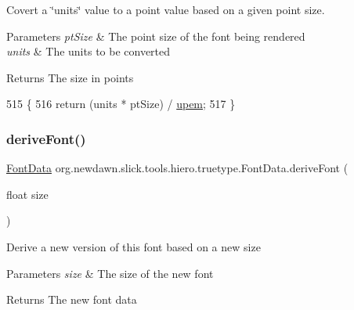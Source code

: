 Covert a \char`\"{}units\char`\"{} value to a point value based on a given point size.


\begin{DoxyParams}{Parameters}
{\em pt\+Size} & The point size of the font being rendered \\
\hline
{\em units} & The units to be converted \\
\hline
\end{DoxyParams}
\begin{DoxyReturn}{Returns}
The size in points 
\end{DoxyReturn}

\begin{DoxyCode}
515                                                           \{
516         \textcolor{keywordflow}{return} (units * ptSize) / \mbox{\hyperlink{classorg_1_1newdawn_1_1slick_1_1tools_1_1hiero_1_1truetype_1_1_font_data_ab589aa26cfcd58d7e7f8ffa3c68800a5}{upem}};
517     \}
\end{DoxyCode}
\mbox{\label{classorg_1_1newdawn_1_1slick_1_1tools_1_1hiero_1_1truetype_1_1_font_data_a15b684f10d110c105f3343f2651c7291}} 
\subsubsection{\texorpdfstring{derive\+Font()}{deriveFont()}\hspace{0.1cm}{\footnotesize\ttfamily [1/2]}}
{\footnotesize\ttfamily \mbox{\hyperlink{classorg_1_1newdawn_1_1slick_1_1tools_1_1hiero_1_1truetype_1_1_font_data}{Font\+Data}} org.\+newdawn.\+slick.\+tools.\+hiero.\+truetype.\+Font\+Data.\+derive\+Font (\begin{DoxyParamCaption}\item[{float}]{size }\end{DoxyParamCaption})\hspace{0.3cm}{\ttfamily [inline]}}

Derive a new version of this font based on a new size


\begin{DoxyParams}{Parameters}
{\em size} & The size of the new font \\
\hline
\end{DoxyParams}
\begin{DoxyReturn}{Returns}
The new font data 
\end{DoxyReturn}

